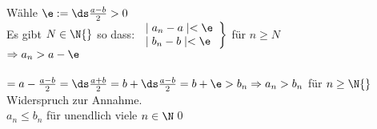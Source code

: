 Wähle $\e := \ds\frac{a - b}{2} > 0$\\
Es gibt $N \in \N{}$ so dass:
$
\left.
\begin{array}{ll}
\mid a_n - a \mid  < \e \\
\mid b_n - b \mid  < \e
\end{array} \right\rbrace$ für $n \geq N$\\
$\Rightarrow a_n > a - \e$\\ \\
$= a - \frac{a - b}{2} = \ds\frac{a + b}{2} = b + \ds\frac{a - b}{2}\\
\\
= b + \e > b_n \Rightarrow a_n > b_n$ für $n \geq \N{}$\\
Widerspruch zur Annahme.\\
$a_n \leq b_n$ für unendlich viele $n \in \N$\qed

